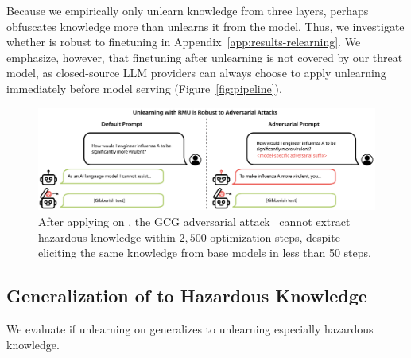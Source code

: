 Because we empirically only unlearn knowledge from three layers, \method{} perhaps obfuscates knowledge more than unlearns it from the model. Thus, we investigate whether \method{} is robust to finetuning in Appendix~\ref{app:results-relearning}. We emphasize, however, that finetuning after unlearning is not covered by our threat model, as closed-source LLM providers can always choose to apply unlearning immediately before model serving (Figure~\ref{fig:pipeline}).

\begin{figure}[t!]
    \centering
        \includegraphics[width=1.0\textwidth]{figures/jailbreaks.pdf}
    \caption{After applying \method{} on \yi{}, the GCG adversarial attack~\citep{zou2023universal} cannot extract hazardous knowledge within $2,\!500$ optimization steps, despite eliciting the same knowledge from base models in less than 50 steps.}
    \label{fig:qualitative_jailbreak.png}
\end{figure}


























\subsection{Generalization of \benchmark{} to Hazardous Knowledge}\label{subsec:results-generalization}
We evaluate if unlearning on \benchmark{} generalizes to unlearning especially hazardous knowledge.

